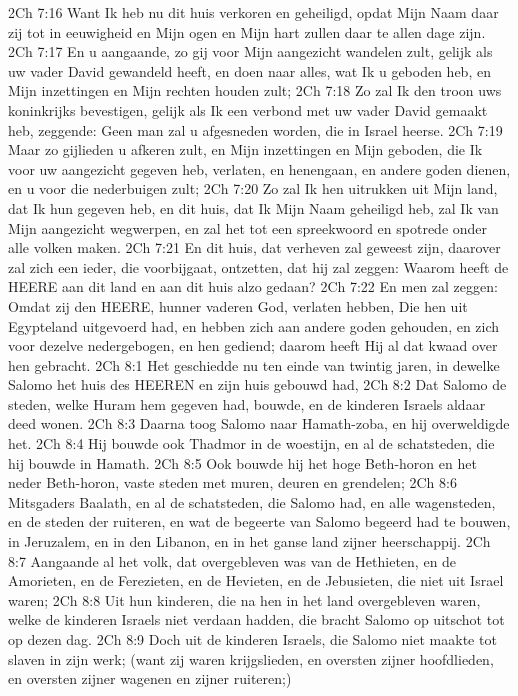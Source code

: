 2Ch 7:16  Want Ik heb nu dit huis verkoren en geheiligd, opdat Mijn Naam daar zij tot in eeuwigheid en Mijn ogen en Mijn hart zullen daar te allen dage zijn.
2Ch 7:17  En u aangaande, zo gij voor Mijn aangezicht wandelen zult, gelijk als uw vader David gewandeld heeft, en doen naar alles, wat Ik u geboden heb, en Mijn inzettingen en Mijn rechten houden zult;
2Ch 7:18  Zo zal Ik den troon uws koninkrijks bevestigen, gelijk als Ik een verbond met uw vader David gemaakt heb, zeggende: Geen man zal u afgesneden worden, die in Israel heerse.
2Ch 7:19  Maar zo gijlieden u afkeren zult, en Mijn inzettingen en Mijn geboden, die Ik voor uw aangezicht gegeven heb, verlaten, en henengaan, en andere goden dienen, en u voor die nederbuigen zult;
2Ch 7:20  Zo zal Ik hen uitrukken uit Mijn land, dat Ik hun gegeven heb, en dit huis, dat Ik Mijn Naam geheiligd heb, zal Ik van Mijn aangezicht wegwerpen, en zal het tot een spreekwoord en spotrede onder alle volken maken.
2Ch 7:21  En dit huis, dat verheven zal geweest zijn, daarover zal zich een ieder, die voorbijgaat, ontzetten, dat hij zal zeggen: Waarom heeft de HEERE aan dit land en aan dit huis alzo gedaan?
2Ch 7:22  En men zal zeggen: Omdat zij den HEERE, hunner vaderen God, verlaten hebben, Die hen uit Egypteland uitgevoerd had, en hebben zich aan andere goden gehouden, en zich voor dezelve nedergebogen, en hen gediend; daarom heeft Hij al dat kwaad over hen gebracht.
2Ch 8:1  Het geschiedde nu ten einde van twintig jaren, in dewelke Salomo het huis des HEEREN en zijn huis gebouwd had,
2Ch 8:2  Dat Salomo de steden, welke Huram hem gegeven had, bouwde, en de kinderen Israels aldaar deed wonen.
2Ch 8:3  Daarna toog Salomo naar Hamath-zoba, en hij overweldigde het.
2Ch 8:4  Hij bouwde ook Thadmor in de woestijn, en al de schatsteden, die hij bouwde in Hamath.
2Ch 8:5  Ook bouwde hij het hoge Beth-horon en het neder Beth-horon, vaste steden met muren, deuren en grendelen;
2Ch 8:6  Mitsgaders Baalath, en al de schatsteden, die Salomo had, en alle wagensteden, en de steden der ruiteren, en wat de begeerte van Salomo begeerd had te bouwen, in Jeruzalem, en in den Libanon, en in het ganse land zijner heerschappij.
2Ch 8:7  Aangaande al het volk, dat overgebleven was van de Hethieten, en de Amorieten, en de Ferezieten, en de Hevieten, en de Jebusieten, die niet uit Israel waren;
2Ch 8:8  Uit hun kinderen, die na hen in het land overgebleven waren, welke de kinderen Israels niet verdaan hadden, die bracht Salomo op uitschot tot op dezen dag.
2Ch 8:9  Doch uit de kinderen Israels, die Salomo niet maakte tot slaven in zijn werk; (want zij waren krijgslieden, en oversten zijner hoofdlieden, en oversten zijner wagenen en zijner ruiteren;)
